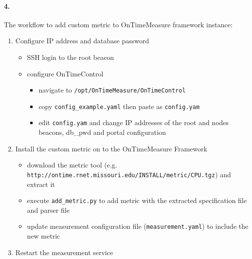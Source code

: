 \documentclass[a4paper]{article}
\begin{document}
\paragraph{4. } The workflow to add custom metric to OnTimeMeasure framework instance:
\begin{enumerate}
	\item Configure IP address and database password
	\begin{itemize}
		\item SSH login to the root beacon
		\item configure OnTimeControl
		\begin{itemize}
			\item navigate to \texttt{/opt/OnTimeMeasure/OnTimeControl}
			\item copy \texttt{config\_example.yaml} then paste as \texttt{config.yam}
			\item edit \texttt{config.yam} and change IP addresses of the root and nodes beacons, db\_pwd and portal configuration
		\end{itemize}
	\end{itemize}
	\item Install the custom metric on to the OnTimeMeasure Framework
	\begin{itemize}
		\item download the metric tool (e.g. \texttt{http://ontime.rnet.missouri.edu/INSTALL/metric/CPU.tgz}) and extract it
		\item execute \texttt{add\_metric.py} to add metric with the extracted specification file and parser file
		\item update measurement configuration file (\texttt{measurement.yaml}) to include the new metric
	\end{itemize}
	\item Restart the measurement service
\end{enumerate}
\end{document}
